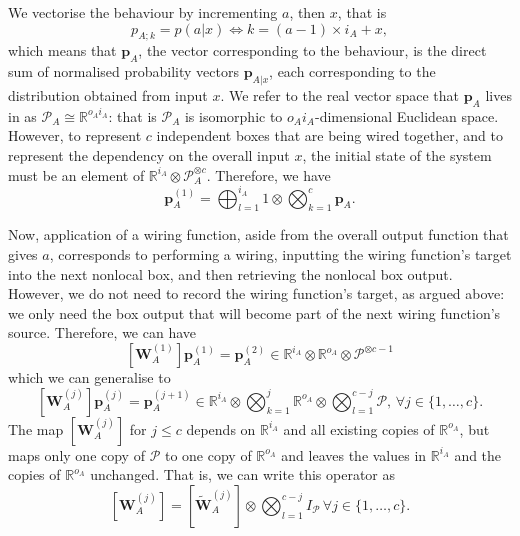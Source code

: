 \documentclass[10pt, a4paper]{article}
\numberwithin{equation}{section} %
\theoremstyle{definition}
\theoremstyle{plain}
\newcommand{\dintv}[2]{\mathopen\{#1,\ldots,#2\mathclose\}}
\newcommand{\?}{\mathrel{?}} %
\newcommand{\R}{\mathbb{R}} %
\newcommand{\cvec}[1]{\boldsymbol{\mathbf{#1}}}    %
\newcommand{\matrp}[2]{\left[\mathbf{#1}#2\right]} %
\newcommand{\sP}{\mathcal{P}}
\begin{document}
      We vectorise the behaviour by incrementing \(a\), then \(x\), that is
      \begin{equation}
        p_{A;k} = p(a|x) \Leftrightarrow k = (a-1) \times i_A + x,
      \end{equation}
      which means that \(\cvec{p}_A\), the vector corresponding to the behaviour, is the direct sum of normalised probability vectors \(\cvec{p}_{A|x}\), each corresponding to the distribution obtained from input \(x\). We refer to the real vector space that \(\cvec{p}_A\) lives in as \(\sP_A \cong \R^{o_Ai_A}\): that is \(\sP_A\) is isomorphic to \(o_Ai_A\)-dimensional Euclidean space. However, to represent \(c\) independent boxes that are being wired together, and to represent the dependency on the overall input \(x\), the initial state of the system must be an element of \(\R^{i_A} \otimes \sP_A^{\otimes c}\). Therefore, we have
      \begin{equation}
        \cvec{p}_A^{(1)} = \bigoplus_{l=1}^{i_A} 1 \otimes \bigotimes_{k=1}^c \cvec{p}_A.
      \end{equation}

      Now, application of a wiring function, aside from the overall output function that gives \(a\), corresponds to performing a wiring, inputting the wiring function's target into the next nonlocal box, and then retrieving the nonlocal box output. However, we do not need to record the wiring function's target, as argued above: we only need the box output that will become part of the next wiring function's source. Therefore, we can have
      \begin{equation}
        \matrp{W}{_A^{(1)}} \cvec{p}_A^{(1)} = \cvec{p}_A^{(2)} \in \R^{i_A} \otimes \R^{o_A} \otimes \sP^{\otimes c-1}
      \end{equation}
      which we can generalise to
      \begin{equation}
        \matrp{W}{_A^{(j)}} \cvec{p}_A^{(j)} = \cvec{p}_A^{(j+1)} \in \R^{i_A} \otimes \bigotimes_{k=1}^{j} \R^{o_A} \otimes \bigotimes_{l=1}^{c-j} \sP,\, \forall j \in \dintv{1}{c}.
      \end{equation}
      The map \(\matrp{W}{_A^{(j)}}\) for \(j \leq c\) depends on \(\R^{i_A}\) and all existing copies of \(\R^{o_A}\), but maps only one copy of \(\sP\) to one copy of \(\R^{o_A}\) and leaves the values in \(\R^{i_A}\) and the copies of \(\R^{o_A}\) unchanged. That is, we can write this operator as
      \begin{equation}
        \matrp{W}{_A^{(j)}} = \matrp{\tilde{W}}{_A^{(j)}} \otimes \bigotimes_{l=1}^{c-j} I_{\sP} \, \forall j \in \dintv{1}{c}.
      \end{equation}
\end{document}
